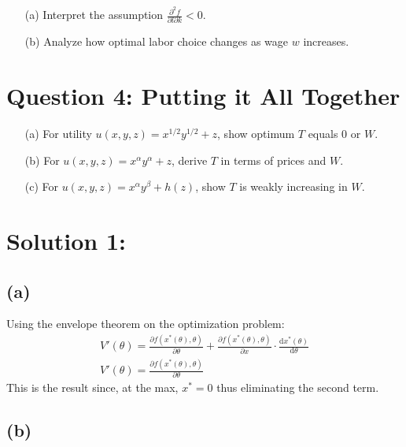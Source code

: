 \documentclass[10pt, a4paper]{article}
\begin{document}
\begin{enumerate}
    \item[(a)] Interpret the assumption $\frac{\partial^2 f}{\partial l \partial k} < 0$.
    \item[(b)] Analyze how optimal labor choice changes as wage $w$ increases.
\end{enumerate}

\section*{Question 4: Putting it All Together}

\begin{enumerate}
    \item[(a)] For utility $u(x, y, z) = x^{1/2} y^{1/2} + z$, show optimum $T$ equals 0 or $W$.
    \item[(b)] For $u(x, y, z) = x^\alpha y^\alpha + z$, derive $T$ in terms of prices and $W$.
    \item[(c)] For $u(x, y, z) = x^\alpha y^\beta + h(z)$, show $T$ is weakly increasing in $W$.
\end{enumerate}

\section*{Solution 1:}
  \subsection*{(a)}
    Using the envelope theorem on the optimization problem:
    \begin{gather*}
      V'(\theta) = \frac{\partial f(x^*(\theta),\theta)}{\partial \theta} + \frac{\partial f(x^*(\theta),\theta)}{\partial x}\cdot\frac{\text{d} x^*(\theta)}{\text{d} \theta} \\
      V'(\theta) = \frac{\partial f(x^*(\theta),\theta)}{\partial \theta}
    \end{gather*}
    This is the result since, at the max, $x^*=0$ thus eliminating the second term.
  \subsection*{(b)}
     
\end{document}
